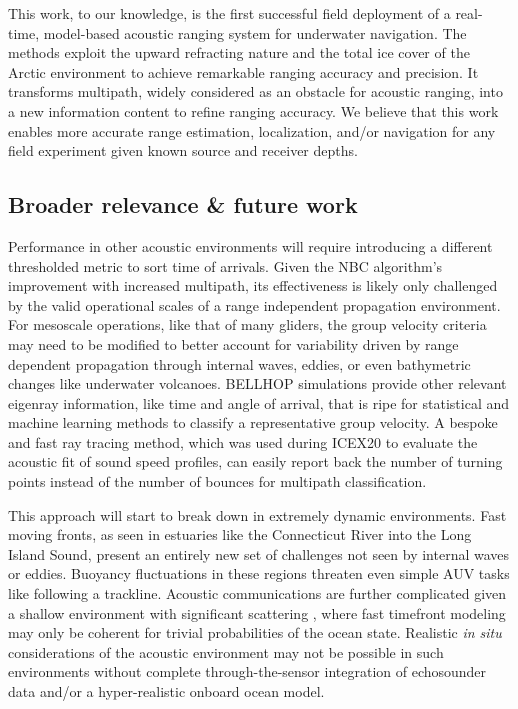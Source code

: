This work, to our knowledge, is the first successful field deployment of a real-time, model-based acoustic ranging system for underwater navigation.
The methods exploit the upward refracting nature and the total ice cover of the Arctic environment to achieve remarkable ranging accuracy and precision.
It transforms multipath, widely considered as an obstacle for acoustic ranging, into a new information content to refine ranging accuracy.
We believe that this work enables more accurate range estimation, localization, and/or navigation for any field experiment given known source and receiver depths.

\subsection{Broader relevance \& future work}

Performance in other acoustic environments will require introducing a different thresholded metric to sort time of arrivals.
Given the NBC algorithm's improvement with increased multipath, its effectiveness is likely only challenged by the valid operational scales of a range independent propagation environment.
For mesoscale operations, like that of many gliders, the group velocity criteria may need to be modified to better account for variability driven by range dependent propagation through internal waves, eddies, or even bathymetric changes like underwater volcanoes.
BELLHOP simulations provide other relevant eigenray information, like time and angle of arrival, that is ripe for statistical and machine learning methods to classify a representative group velocity.
A bespoke and fast ray tracing method, which was used during ICEX20 to evaluate the acoustic fit of sound speed profiles, can easily report back the number of turning points instead of the number of bounces for multipath classification.

This approach will start to break down in extremely dynamic environments.
Fast moving fronts, as seen in estuaries like the Connecticut River into the Long Island Sound, present an entirely new set of challenges not seen by internal waves or eddies.
Buoyancy fluctuations in these regions threaten even simple AUV tasks like following a trackline.
Acoustic communications are further complicated given a shallow environment with significant scattering \citep{lavery_measurements_2010,ross_acoustic_2012,lavery_broadband_2013}, where fast timefront modeling may only be coherent for trivial probabilities of the ocean state.
Realistic \textit{in situ} considerations of the acoustic environment may not be possible in such environments without complete through-the-sensor integration of echosounder data and/or a hyper-realistic onboard ocean model.

